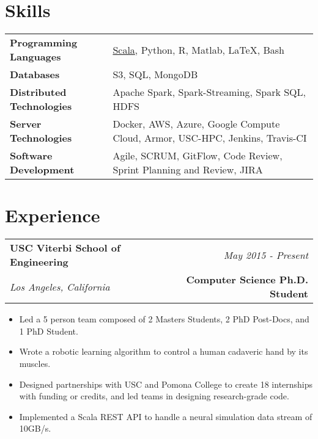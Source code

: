 \documentclass[10pt,a4paper]{article}
\begin{document}
  \newpage

\vspace*{-15mm}\section*{Skills}
  \noindent\begin{tabularx}{17cm}{l X}
    \textbf{Programming Languages} & \href{https://github.com/briancohn/space/blob/master/src/main/scala/bbdl/space/MyAdder.scala}{Scala}, Python, R, Matlab, \LaTeX, Bash \\
    \textbf{Databases} & S3, SQL, MongoDB \\
    \textbf{Distributed Technologies} & Apache Spark, Spark-Streaming, Spark SQL, HDFS \\
    \textbf{Server Technologies} & Docker, AWS, Azure, Google Compute Cloud, Armor, USC-HPC, Jenkins, Travis-CI \\
    \textbf{Software Development} & Agile, SCRUM, GitFlow, Code Review, Sprint Planning and Review, JIRA \\
  \end{tabularx}



    \vspace*{3mm}\section*{Experience}
  \noindent\begin{tabularx}{17cm}{X r}
    \textbf{USC Viterbi School of Engineering} & \textit{May 2015 - Present} \\
    \textit{Los Angeles, California} & \textbf{Computer Science Ph.D. Student} \\
  \end{tabularx}

  \vspace*{1mm}\noindent\begin{minipage}{17cm}
    \begin{itemize}[leftmargin=6mm,topsep=0mm,itemsep=-1mm]
      \item Led a 5 person team composed of 2 Masters Students, 2 PhD Post-Docs, and 1 PhD Student.
      \item Wrote a robotic learning algorithm to control a human cadaveric hand by its muscles. 
     \item Designed partnerships with USC and Pomona College to create 18 internships with funding or credits, and led teams in designing research-grade code.
      \item Implemented a Scala REST API to handle a neural simulation data stream of 10GB/s.
    \end{itemize}
  \end{minipage}
\end{document}
